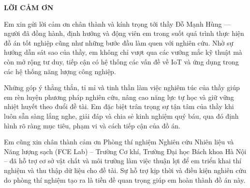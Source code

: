 \documentclass[../main.tex]{subfiles}
\begin{document}
\begin{center}
    \Large{\textbf{LỜI CẢM ƠN}}\\
\end{center}
\vspace{1cm}
Em xin gửi lời cảm ơn chân thành và kính trọng tới thầy Đỗ Mạnh Hùng — người đã đồng hành, định hướng và động viên em trong suốt quá trình thực hiện đồ án tốt nghiệp cũng như những bước đầu làm quen với nghiên cứu. Nhờ sự hướng dẫn sát sao của thầy, em không chỉ vượt qua các vướng mắc kỹ thuật mà còn mở rộng tư duy, tiếp cận có hệ thống các vấn đề về IoT và ứng dụng trong các hệ thống năng lượng công nghiệp.

Những góp ý thẳng thắn, tỉ mỉ và tinh thần làm việc nghiêm túc của thầy giúp em rèn luyện phương pháp nghiên cứu, nâng cao năng lực tự học và giữ vững nhiệt huyết theo đuổi đề tài. Em đặc biệt trân trọng sự tận tâm của thầy khi luôn sẵn sàng lắng nghe, giải đáp và chia sẻ kinh nghiệm quý báu, qua đó định hình rõ ràng mục tiêu, phạm vi và cách tiếp cận của đồ án.

Em cũng xin chân thành cảm ơn Phòng thí nghiệm Nghiên cứu Nhiên liệu và Năng lượng sạch (FCE Lab) – Trường Cơ khí, Trường Đại học Bách khoa Hà Nội – đã hỗ trợ cơ sở vật chất và môi trường làm việc thuận lợi để em triển khai thí nghiệm và thu thập dữ liệu cho đề tài. Sự hỗ trợ kịp thời và điều kiện nghiên cứu do phòng thí nghiệm tạo ra là tiền đề quan trọng giúp em hoàn thành đồ án này.
\end{document}
